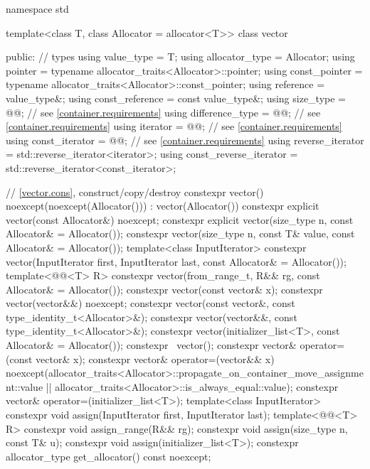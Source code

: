 \begin{codeblock}
namespace std {
  template<class T, class Allocator = allocator<T>>
  class vector {
  public:
    // types
    using value_type             = T;
    using allocator_type         = Allocator;
    using pointer                = typename allocator_traits<Allocator>::pointer;
    using const_pointer          = typename allocator_traits<Allocator>::const_pointer;
    using reference              = value_type&;
    using const_reference        = const value_type&;
    using size_type              = @@; // see \ref{container.requirements}
    using difference_type        = @@; // see \ref{container.requirements}
    using iterator               = @@; // see \ref{container.requirements}
    using const_iterator         = @@; // see \ref{container.requirements}
    using reverse_iterator       = std::reverse_iterator<iterator>;
    using const_reverse_iterator = std::reverse_iterator<const_iterator>;

    // \ref{vector.cons}, construct/copy/destroy
    constexpr vector() noexcept(noexcept(Allocator())) : vector(Allocator()) { }
    constexpr explicit vector(const Allocator&) noexcept;
    constexpr explicit vector(size_type n, const Allocator& = Allocator());
    constexpr vector(size_type n, const T& value, const Allocator& = Allocator());
    template<class InputIterator>
      constexpr vector(InputIterator first, InputIterator last, const Allocator& = Allocator());
    template<@@<T> R>
      constexpr vector(from_range_t, R&& rg, const Allocator& = Allocator());
    constexpr vector(const vector& x);
    constexpr vector(vector&&) noexcept;
    constexpr vector(const vector&, const type_identity_t<Allocator>&);
    constexpr vector(vector&&, const type_identity_t<Allocator>&);
    constexpr vector(initializer_list<T>, const Allocator& = Allocator());
    constexpr ~vector();
    constexpr vector& operator=(const vector& x);
    constexpr vector& operator=(vector&& x)
      noexcept(allocator_traits<Allocator>::propagate_on_container_move_assignment::value ||
               allocator_traits<Allocator>::is_always_equal::value);
    constexpr vector& operator=(initializer_list<T>);
    template<class InputIterator>
      constexpr void assign(InputIterator first, InputIterator last);
    template<@@<T> R>
      constexpr void assign_range(R&& rg);
    constexpr void assign(size_type n, const T& u);
    constexpr void assign(initializer_list<T>);
    constexpr allocator_type get_allocator() const noexcept;

}}
\end{codeblock}
